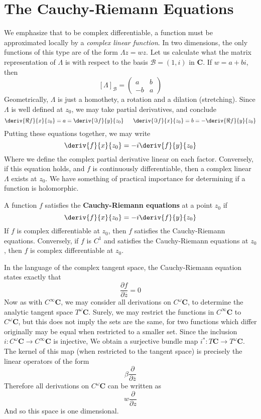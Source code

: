\section{The Cauchy-Riemann Equations}

We emphasize that to be complex differentiable, a function must be approximated locally by a {\it complex linear function}. In two dimensions, the only functions of this type are of the form $\Lambda z = wz$. Let us calculate what the matrix representation of $\Lambda$ is with respect to the basis $\mathcal{B} = (1, i)$ in $\mathbf{C}$. If $w = a + bi$, then
%
\[ [\Lambda]_{\mathcal{B}} = \begin{pmatrix} a & b \\ -b & a \end{pmatrix} \]
%
Geometrically, $\Lambda$ is just a homothety, a rotation and a dilation (stretching). Since $\Lambda$ is well defined at $z_0$, we may take partial derivatives, and conclude
%
\[ \deriv{\Re f}{x}{z_0} = a = \deriv{\Im f}{y}{z_0}\ \ \ \ \ \deriv{\Im f}{x}{z_0} = b = -\deriv{\Re f}{y}{z_0} \]
%
Putting these equations together, we may write
%
\[ \deriv{f}{x}{z_0} = -i \deriv{f}{y}{z_0} \]
%
Where we define the complex partial derivative linear on each factor. Conversely, if this equation holds, and $f$ is continuously differentiable, then a complex linear $\Lambda$ exists at $z_0$. We have something of practical importance for determining if a function is holomorphic.

\begin{theorem}
    A function $f$ satisfies the {\bf Cauchy-Riemann equations} at a point $z_0$ if
    \[ \deriv{f}{x}{z_0} = -i \deriv{f}{y}{z_0} \]
    If $f$ is complex differentiable at $z_0$, then $f$ satisfies the Cauchy-Riemann equations. Conversely, if $f$ is $C^1$ and satisfies the Cauchy-Riemann equations at $z_0$, then $f$ is complex differentiable at $z_0$.
\end{theorem}

In the language of the complex tangent space, the Cauchy-Riemann equation states exactly that
%
\[ \frac{\partial f}{\partial \overline{z}} = 0 \]
%
Now as with $C^\infty \mathbf{C}$, we may consider all derivations on $C^\omega \mathbf{C}$, to determine the analytic tangent space $T^\omega \mathbf{C}$. Surely, we may restrict the functions in $C^\infty \mathbf{C}$ to $C^\omega \mathbf{C}$, but this does not imply the sets are the same, for two functions which differ originally may be equal when restricted to a smaller set. Since the inclusion $i:C^\omega \mathbf{C} \to C^\infty \mathbf{C}$ is injective, We obtain a surjective bundle map $i^*: T \mathbf{C} \to T^\omega \mathbf{C}$. The kernel of this map (when restricted to the tangent space) is precisely the linear operators of the form
%
\[ \beta \frac{\partial}{\partial \overline{z}} \]
%
Therefore all derivations on $C^\omega \mathbf{C}$ can be written as
%
\[ w \frac{\partial}{\partial z} \]
%
And so this space is one dimensional.

